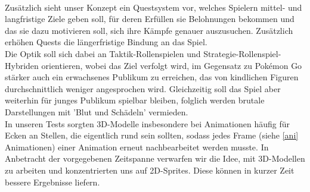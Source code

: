 \documentclass[extern,palatino]{cgBA}
\begin{document}
\\Zusätzlich sieht unser Konzept ein Questsystem vor, welches Spielern mittel- und langfristige Ziele geben soll, für deren Erfüllen sie Belohnungen bekommen und das sie dazu motivieren soll, sich ihre Kämpfe genauer auszusuchen. Zusätzlich erhöhen Quests die längerfristige Bindung an das Spiel.
\\Die Optik soll sich dabei an Taktik-Rollenspielen und Strategie-Rollenspiel-Hybriden orientieren, wobei das Ziel verfolgt wird, im Gegensatz zu Pokémon Go stärker auch ein erwachsenes Publikum zu erreichen, das von kindlichen Figuren durchschnittlich weniger angesprochen wird. Gleichzeitig soll das Spiel aber weiterhin für junges Publikum spielbar bleiben, folglich werden brutale Darstellungen mit 'Blut und Schädeln' vermieden.
\\In unseren Tests sorgten 3D-Modelle insbesondere bei Animationen häufig für Ecken an Stellen, die eigentlich rund sein sollten, sodass jedes Frame (siehe \ref{ani} Animationen) einer Animation erneut nachbearbeitet werden musste. In Anbetracht der vorgegebenen Zeitspanne verwarfen wir die Idee, mit 3D-Modellen zu arbeiten und konzentrierten uns auf 2D-Sprites. Diese können in kurzer Zeit bessere Ergebnisse liefern.
\end{document}
